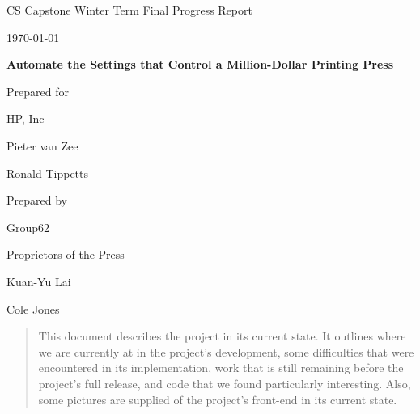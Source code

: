 \documentclass[onecolumn, draftclsnofoot,10pt, compsoc]{IEEEtran}
\def \CapstoneTeamName{Proprietors of the Press}
\def \CapstoneTeamNumber{62}
\def \GroupMemberOne{Kuan-Yu Lai}
\def \GroupMemberTwo{Cole Jones}
\def \CapstoneProjectName{Automate the Settings that Control a Million-Dollar Printing Press}
\def \CapstoneSponsorCompany{HP, Inc}
\def \CapstoneSponsorPersonA{Pieter van Zee}
\def \CapstoneSponsorPersonB{Ronald Tippetts}
\def \DocType{Winter Term Final Progress Report}
\newcommand{\NameSigPair}[1]{\par
\makebox[2.75in][r]{#1} \hfil 	\makebox[3.25in]{\makebox[2.25in]{\hrulefill} \hfill		\makebox[.75in]{\hrulefill}}
\par\vspace{-12pt} \textit{\tiny\noindent
\makebox[2.75in]{} \hfil		\makebox[3.25in]{\makebox[2.25in][r]{Signature} \hfill	\makebox[.75in][r]{Date}}}}
\renewcommand{\NameSigPair}[1]{#1}
\begin{document}
\begin{titlepage}
    \begin{singlespace}
        \hfill 
        \par\vspace{.2in}
        \centering
        \scshape{
            \huge CS Capstone \DocType \par
            {\large\AdvanceDate[-1]\today}\par
            \vspace{1.0in}
            \textbf{\Huge\CapstoneProjectName}\par
            \vfill
            {\large Prepared for}\par
            \Huge \CapstoneSponsorCompany\par
            \vspace{5pt}
            {\Large\NameSigPair{\CapstoneSponsorPersonA}\par}
            {\Large\NameSigPair{\CapstoneSponsorPersonB}\par}
            {\large Prepared by }\par
            Group\CapstoneTeamNumber\par
            \CapstoneTeamName\par 
            \vspace{5pt}
            {\Large
                \NameSigPair{\GroupMemberOne}\par
                \NameSigPair{\GroupMemberTwo}\par
            }
            \vspace{20pt}
        }
        \vspace{72pt}
        \begin{abstract}
        	This document describes the project in its current state. It outlines where we are currently at in the project's development, some difficulties that were encountered in its implementation, work that is still remaining before the project's full release, and code that we found particularly interesting. Also, some pictures are supplied of the project's front-end in its current state.
        \end{abstract}
    \end{singlespace}
\end{titlepage}
\newpage
{}
\tableofcontents
\listoffigures
\clearpage
\end{document}
